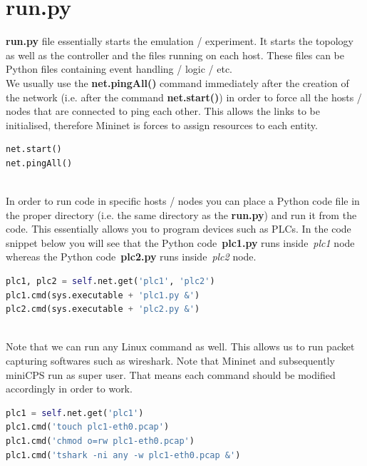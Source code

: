 \documentclass[book,a4paper,12pt,oneside]{memoir}
\begin{document}
\newpage
\section{run.py}
\label{cha:basicuse-sec:run}
\textbf{run.py} file essentially starts the emulation / experiment.  It starts the topology as well as the controller and the files running on each host.  These files can be Python files containing event handling / logic / etc.
\\ We usually use the \textbf{net.pingAll()} command immediately after the creation of the network (i.e. after the command \textbf{net.start()}) in order to force all the hosts / nodes that are connected to ping each other.  This allows the links to be initialised, therefore Mininet is forces to assign resources to each entity.  

\begin{lstlisting}[backgroundcolor = \color{ultralightgray}, language = Python, xleftmargin = 0.1cm, framexleftmargin = 0.3em, showstringspaces=false]
net.start()
net.pingAll()
\end{lstlisting}


\noindent \\ In order to run code in specific hosts / nodes you can place a Python code file in the proper directory (i.e. the same directory as the \textbf{run.py}) and run it from the code.  This essentially allows you to program devices such as PLCs.  In the code snippet below you will see that the Python code~\textbf{plc1.py} runs inside~\textit{plc1} node whereas the Python code~\textbf{plc2.py} runs inside~\textit{plc2} node.

\begin{lstlisting}[backgroundcolor = \color{ultralightgray}, language = Python, xleftmargin = 0.1cm, framexleftmargin = 0.3em, showstringspaces=false]
plc1, plc2 = self.net.get('plc1', 'plc2')
plc1.cmd(sys.executable + 'plc1.py &')
plc2.cmd(sys.executable + 'plc2.py &')
\end{lstlisting}


\noindent \\ Note that we can run any Linux command as well.  This allows us to run packet capturing softwares such as wireshark.  Note that Mininet and subsequently miniCPS run as super user.  That means each command should be modified accordingly in order to work.

\begin{lstlisting}[backgroundcolor = \color{ultralightgray}, language = Python, xleftmargin = 0.1cm, framexleftmargin = 0.3em, showstringspaces=false]
plc1 = self.net.get('plc1')
plc1.cmd('touch plc1-eth0.pcap')
plc1.cmd('chmod o=rw plc1-eth0.pcap')
plc1.cmd('tshark -ni any -w plc1-eth0.pcap &')
\end{lstlisting}
\end{document}
